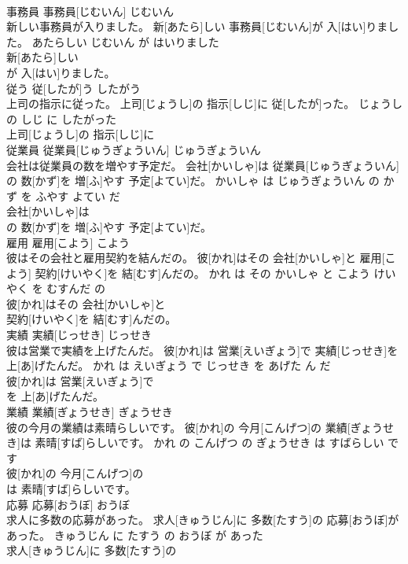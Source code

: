 \documentclass[8pt]{extreport}
\begin{document}
\begin{CJK}{UTF8}{min}
\\	事務員	事務員[じむいん]	じむいん	
\\	新しい事務員が入りました。	新[あたら]しい 事務員[じむいん]が 入[はい]りました。	あたらしい じむいん が はいりました	
\\	新[あたら]しい
\\	が 入[はい]りました。			
\\	従う	従[したが]う	したがう	
\\	上司の指示に従った。	上司[じょうし]の 指示[しじ]に 従[したが]った。	じょうし の しじ に したがった	
\\	上司[じょうし]の 指示[しじ]に
\\	従業員	従業員[じゅうぎょういん]	じゅうぎょういん	
\\	会社は従業員の数を増やす予定だ。	会社[かいしゃ]は 従業員[じゅうぎょういん]の 数[かず]を 増[ふ]やす 予定[よてい]だ。	かいしゃ は じゅうぎょういん の かず を ふやす よてい だ	
\\	会社[かいしゃ]は
\\	の 数[かず]を 増[ふ]やす 予定[よてい]だ。			
\\	雇用	雇用[こよう]	こよう	
\\	彼はその会社と雇用契約を結んだの。	彼[かれ]はその 会社[かいしゃ]と 雇用[こよう] 契約[けいやく]を 結[むす]んだの。	かれ は その かいしゃ と こよう けいやく を むすんだ の	
\\	彼[かれ]はその 会社[かいしゃ]と
\\	契約[けいやく]を 結[むす]んだの。			
\\	実績	実績[じっせき]	じっせき	
\\	彼は営業で実績を上げたんだ。	彼[かれ]は 営業[えいぎょう]で 実績[じっせき]を 上[あ]げたんだ。	かれ は えいぎょう で じっせき を あげた ん だ	
\\	彼[かれ]は 営業[えいぎょう]で
\\	を 上[あ]げたんだ。			
\\	業績	業績[ぎょうせき]	ぎょうせき	
\\	彼の今月の業績は素晴らしいです。	彼[かれ]の 今月[こんげつ]の 業績[ぎょうせき]は 素晴[すば]らしいです。	かれ の こんげつ の ぎょうせき は すばらしい です	
\\	彼[かれ]の 今月[こんげつ]の
\\	は 素晴[すば]らしいです。			
\\	応募	応募[おうぼ]	おうぼ	
\\	求人に多数の応募があった。	求人[きゅうじん]に 多数[たすう]の 応募[おうぼ]があった。	きゅうじん に たすう の おうぼ が あった	
\\	求人[きゅうじん]に 多数[たすう]の

\end{CJK}
\end{document}
